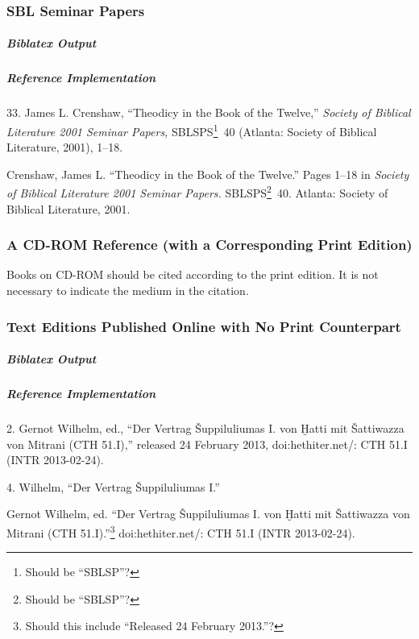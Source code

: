 \documentclass[a4paper]{article}
\newenvironment{biboutput}{%
  \subparagraph{Biblatex Output}
}{\color{black}}
\newenvironment{refimp}{%
  \subparagraph{Reference Implementation}
  \color{reference-colour}
  \rm
}{\par\color{black}}
\begin{document}
\subsubsection{SBL Seminar Papers}

\begin{biboutput}
\end{biboutput}

\begin{refimp}
  \hspace*{\bibindent}33. James L. Crenshaw, “Theodicy in the Book of the
  Twelve,” \emph{Society of Biblical Literature 2001 Seminar Papers,}
  SBLSPS\footnote{Should be “SBLSP”?}~40 (Atlanta: Society of Biblical
  Literature, 2001), 1–18.
  
  \hangindent\bibindent Crenshaw, James L. “Theodicy in the Book of the
  Twelve.” Pages 1–18 in \emph{Society of Biblical Literature 2001 Seminar
  Papers.} SBLSPS\footnote{Should be “SBLSP”?}~40. Atlanta: Society of
  Biblical Literature, 2001.

\end{refimp}

\subsubsection{A CD-ROM Reference (with a Corresponding Print Edition)}

Books on CD-ROM should be cited according to the print edition. It is not
necessary to indicate the medium in the citation.

\subsubsection{Text Editions Published Online with No Print Counterpart}

\begin{biboutput}
\end{biboutput}

\begin{refimp}
  \hspace*{\bibindent}2. Gernot Wilhelm, ed., “Der Vertrag Šuppiluliumas I.
  von Ḫatti mit Šattiwazza von Mitrani (CTH 51.I),” released 24 February 2013,
  doi:hethiter.net/: CTH 51.I (INTR 2013-02-24).

  \hspace*{\bibindent}4. Wilhelm, “Der Vertrag Šuppiluliumas I.”

  \hangindent\bibindent Gernot Wilhelm, ed. “Der Vertrag Šuppiluliumas I. von
  Ḫatti mit Šattiwazza von Mitrani (CTH 51.I).”\footnote{Should this include
  “Released 24 February 2013.”?} doi:hethiter.net/: CTH 51.I
  (INTR 2013-02-24).
\end{refimp}
\end{document}
